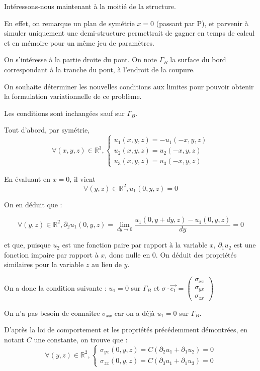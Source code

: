 

Intéressons-nous maintenant à la moitié de la structure. 

En effet, on remarque un plan de symétrie $x=0$ (passant par P), 
et parvenir à simuler uniquement une demi-structure permettrait de gagner en temps de calcul et en mémoire pour un même jeu de paramètres.

On s'intéresse à la partie droite du pont. On note $\Gamma_B$ la surface du bord correspondant à la tranche du pont, à l'endroit de la coupure.

On souhaite déterminer les nouvelles conditions aux limites pour pouvoir obtenir la formulation variationnelle de ce problème.

Les conditions sont inchangées sauf sur $\Gamma_B$.

Tout d'abord, par symétrie, 
$$\forall (x,y,z) \in \mathbb{R}^3,
\begin{cases}
 u_1(x,y,z) = - u_1(-x,y,z)\\
 u_2(x,y,z) = u_2(-x,y,z)\\
 u_3(x,y,z) = u_3(-x,y,z)
\end{cases}
$$

En évaluant en $x=0$, il vient
$$\forall (y,z) \in \mathbb{R}^2, u_1(0,y,z) = 0$$

On en déduit que :

$$\forall (y,z) \in \mathbb{R}^2, \partial_2 u_1 (0, y, z) = \lim_{dy\rightarrow 0} \frac{u_1(0,y+dy,z)-u_1(0,y,z)}{dy}=0$$

et que, puisque $u_2$ est une fonction paire par rapport à la variable $x$, $\partial_1 u_2$ est une fonction impaire par rapport à $x$, 
donc nulle en $0$. On déduit des propriétés similaires pour la variable $z$ au lieu de $y$.

On a donc la condition suivante : $u_1 = 0$ sur $\Gamma_B$ et $\sigma \cdot \vec{e_1}=
\begin{pmatrix}
    \sigma_{xx}\\
    \sigma_{yx}\\
    \sigma_{zx}
\end{pmatrix}$

On n'a pas besoin de connaitre $\sigma_{xx}$ car on a déjà $u_1 = 0$ sur $\Gamma_B$. 

D'après la loi de comportement et les propriétés précédemment démontrées, en notant $C$ une constante, on trouve que :
 $$
 \forall (y,z) \in \mathbb{R}^2,
 \begin{cases}
    \sigma_{yx}(0, y, z) = C (\partial_2 u_1 + \partial_1 u_2) = 0\\
    \sigma_{zx}(0, y, z) = C (\partial_3 u_1 + \partial_1 u_3) = 0
 \end{cases}
$$

